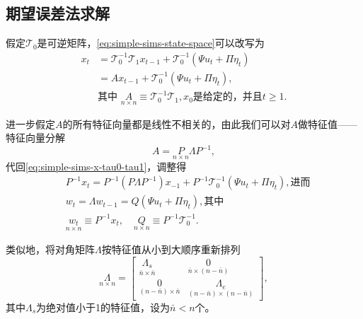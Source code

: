 \subsection{期望误差法求解}
假定$\mathcal{T}_0$是可逆矩阵，\eqref{eq:simple-sims-state-space}可以改写为
\begin{equation}
  \label{eq:simple-sims-x-tau0-tau1}
  \begin{split}
    x_t &= \mathcal{T}_{0}^{-1} \mathcal{T}_1 x_{t-1} + \mathcal{T}_{0}^{-1} \left( \Psi u_t + \Pi \eta_t \right) \\
    & =A x_{t-1} + \mathcal{T}_{0}^{-1} \left( \Psi u_t + \Pi \eta_t \right) , \\
    &\text{其中 } \underset{n \times n}{A} \equiv \mathcal{T}_{0}^{-1} \mathcal{T}_{1}, x_0 \text{是给定的，并且} t \ge 1.
  \end{split}
\end{equation}

进一步假定$A$的所有特征向量都是线性不相关的，由此我们可以对$A$做特征值——特征向量分解
\begin{equation*}
  A = \underset{n \times n}{P} {\Lambda} P^{-1},
\end{equation*}
代回\eqref{eq:simple-sims-x-tau0-tau1}，调整得
\begin{equation}
  \label{eq:simple-sims-w-A-Q}
  \begin{split}
  &P^{-1} x_{t} = P^{-1} \left( P \Lambda P^{-1} \right) x_{-1} + P^{-1} \mathcal{T}_{0}^{-1} \left( \Psi u_t + \Pi \eta_t \right), \text{进而}\\
  &w_t = \Lambda w_{t-1} = Q \left( \Psi u_t + \Pi \eta_t \right), \text{其中} \\
  &\underset{n \times n}{w_t} \equiv P^{-1} x_t, \quad \underset{n \times n}{Q} \equiv P^{-1} \mathcal{T}_0^{-1}.
\end{split}
\end{equation}

类似地，将对角矩阵$\Lambda$按特征值从小到大顺序重新排列
\begin{equation}
  \label{eq:simple-sims-eigenvector-decomp}
  \underset{n \times n}{\Lambda} = \begin{bmatrix}
  \underset{\bar{n} \times \bar{n}}{\Lambda_s} & \underset{\bar{n} \times \left( n - \bar{n} \right)}{0} \\
  \underset{\left( n - \bar{n} \right)  \times \bar{n}}{0} &  \underset{ \left( n - \bar{n} \right) \times \left( n - \bar{n}\right) }{\Lambda_e}
  \end{bmatrix},
\end{equation}
其中$\Lambda_s$为绝对值小于1的特征值，设为$\bar{n} < n$个。


